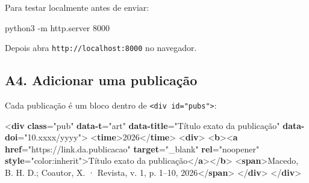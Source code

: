 \documentclass[
  10pt,
]{article}
\newenvironment{Shaded}{\begin{snugshade}}{\end{snugshade}}
\newcommand{\AttributeTok}[1]{\textcolor[rgb]{0.13,0.29,0.53}{#1}}
\newcommand{\DataTypeTok}[1]{\textcolor[rgb]{0.13,0.29,0.53}{#1}}
\newcommand{\ErrorTok}[1]{\textcolor[rgb]{0.64,0.00,0.00}{\textbf{#1}}}
\newcommand{\ExtensionTok}[1]{#1}
\newcommand{\KeywordTok}[1]{\textcolor[rgb]{0.13,0.29,0.53}{\textbf{#1}}}
\newcommand{\NormalTok}[1]{#1}
\newcommand{\OtherTok}[1]{\textcolor[rgb]{0.56,0.35,0.01}{#1}}
\newcommand{\StringTok}[1]{\textcolor[rgb]{0.31,0.60,0.02}{#1}}
\begin{document}
Para testar localmente antes de enviar:

\begin{Shaded}
\begin{Highlighting}[]
\ExtensionTok{python3} \AttributeTok{{-}m}\NormalTok{ http.server 8000}
\end{Highlighting}
\end{Shaded}

Depois abra
\texttt{http:\allowbreak{}/\allowbreak{}/\allowbreak{}localhost:\allowbreak{}8000}
no navegador.

\hypertarget{a4.-adicionar-uma-publicauxe7uxe3o}{%
\subsection{A4. Adicionar uma
publicação}\label{a4.-adicionar-uma-publicauxe7uxe3o}}

Cada publicação é um bloco dentro de \texttt{<div id="pubs">}:

\begin{Shaded}
\begin{Highlighting}[]
\DataTypeTok{\textless{}}\KeywordTok{div} \ErrorTok{class}\OtherTok{=}\StringTok{"pub"} \ErrorTok{data{-}t}\OtherTok{=}\StringTok{"art"} \ErrorTok{data{-}title}\OtherTok{=}\StringTok{"Título exato da publicação"} \ErrorTok{data{-}doi}\OtherTok{=}\StringTok{"10.xxxx/yyyy"}\DataTypeTok{\textgreater{}}
  \DataTypeTok{\textless{}}\KeywordTok{time}\DataTypeTok{\textgreater{}}\NormalTok{2026}\DataTypeTok{\textless{}/}\KeywordTok{time}\DataTypeTok{\textgreater{}}
  \DataTypeTok{\textless{}}\KeywordTok{div}\DataTypeTok{\textgreater{}}
    \DataTypeTok{\textless{}}\KeywordTok{b}\DataTypeTok{\textgreater{}\textless{}}\KeywordTok{a} \ErrorTok{href}\OtherTok{=}\StringTok{"https://link.da.publicacao"} \ErrorTok{target}\OtherTok{=}\StringTok{"\_blank"} \ErrorTok{rel}\OtherTok{=}\StringTok{"noopener"} \ErrorTok{style}\OtherTok{=}\StringTok{"color:inherit"}\DataTypeTok{\textgreater{}}\NormalTok{Título exato da publicação}\DataTypeTok{\textless{}/}\KeywordTok{a}\DataTypeTok{\textgreater{}\textless{}/}\KeywordTok{b}\DataTypeTok{\textgreater{}}
    \DataTypeTok{\textless{}}\KeywordTok{span}\DataTypeTok{\textgreater{}}\NormalTok{Macedo, B. H. D.; Coautor, X. · Revista, v. 1, p. 1–10, 2026}\DataTypeTok{\textless{}/}\KeywordTok{span}\DataTypeTok{\textgreater{}}
  \DataTypeTok{\textless{}/}\KeywordTok{div}\DataTypeTok{\textgreater{}}
\DataTypeTok{\textless{}/}\KeywordTok{div}\DataTypeTok{\textgreater{}}
\end{Highlighting}
\end{Shaded}
\end{document}
